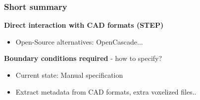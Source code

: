 \begin{frame}
	\frametitle{Short summary}
	\begin{minipage}{0.85\textwidth}
	\textbf{Direct interaction with CAD formats (STEP)}	
		\begin{itemize}
		\item Open-Source alternatives: OpenCascade...
		\end{itemize}
	\textbf{Boundary conditions required} - how to specify?
		\begin{itemize}
		\item Current state: Manual specification
		\item Extract metadata from CAD formats, extra voxelized files..
		\end{itemize}
		
	\end{minipage}
	\begin{minipage}{0.14\textwidth}
		\begin{figure}
			\\

\end{figure}
\end{minipage}
\end{frame}
